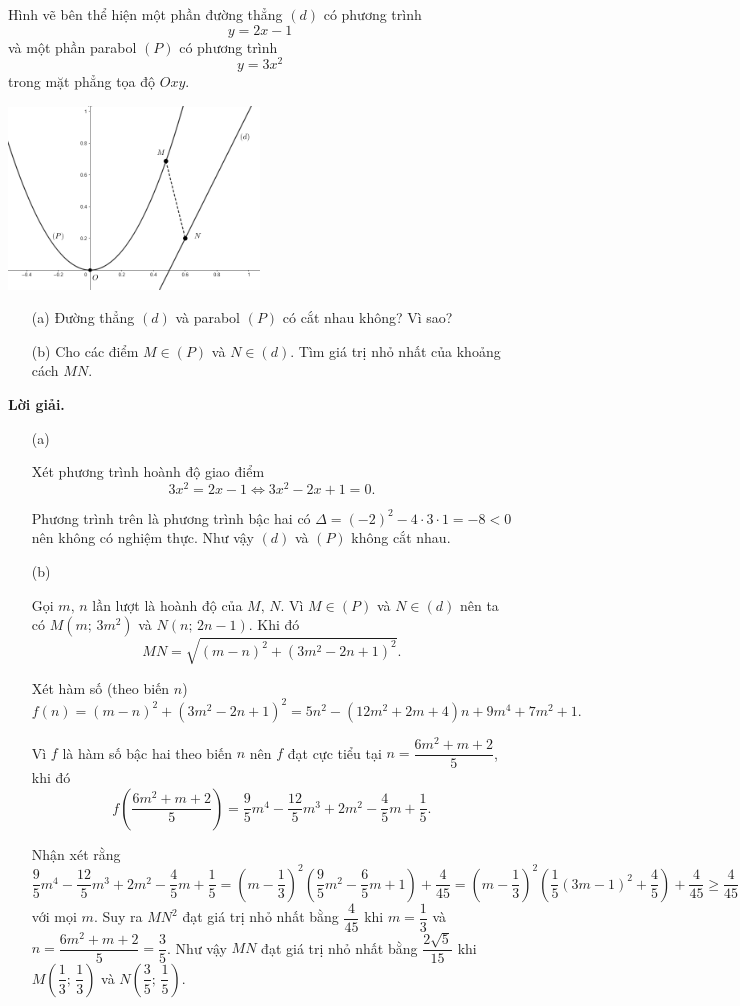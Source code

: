 \begin{tcolorbox}[title=\textbf{Bài toán B.3 + A.3.},breakable]
    Hình vẽ bên thể hiện một phần đường thẳng $(d)$ có phương trình $$y = 2x - 1$$ và một phần parabol $(P)$ có phương trình $$y = 3x^2$$ trong mặt phẳng tọa độ $Oxy$.
    \begin{center}
        \includegraphics[width=0.5\textwidth]{Figures/04.png}
    \end{center}
    \begin{enumerate}
        \item[(a)] {Đường thẳng $(d)$ và parabol $(P)$ có cắt nhau không? Vì sao?}
        \item[(b)] {Cho các điểm $M \in (P)$ và $N\in (d)$. Tìm giá trị nhỏ nhất của khoảng cách $MN$.} 
    \end{enumerate}
\end{tcolorbox}

\textbf{Lời giải. }

\begin{enumerate}
    \item[(a)] {Xét phương trình hoành độ giao điểm $$3x^2 = 2x - 1 \iff 3x^2 - 2x + 1 = 0.$$
    
    Phương trình trên là phương trình bậc hai có $\Delta = (-2)^2 - 4\cdot 3 \cdot 1 = -8 < 0$ nên không có nghiệm thực. Như vậy $(d)$ và $(P)$ không cắt nhau.}
    \item[(b)] {Gọi $m,\,n$ lần lượt là hoành độ của $M,\,N$. Vì $M\in (P)$ và $N \in (d)$ nên ta có $M\left(m;\,3m^2\right)$ và $N\left(n;\,2n-1\right)$. Khi đó $$MN = \sqrt{(m-n)^2 + (3m^2 - 2n + 1)^2}.$$
    
    Xét hàm số (theo biến $n$) $$f(n) = (m-n)^2 + (3m^2 - 2n + 1)^2 = 5n^2 - (12m^2+2m+4)n + 9m^4 + 7m^2 + 1.$$
    
    Vì $f$ là hàm số bậc hai theo biến $n$ nên $f$ đạt cực tiểu tại $n = \dfrac{6m^2+m+2}{5}$, khi đó $$f\left(\dfrac{6m^2+m+2}{5}\right) = \dfrac{9}{5}m^4 - \dfrac{12}{5}m^3 + 2m^2 - \dfrac{4}{5}m + \dfrac{1}{5}.$$
    
    Nhận xét rằng $\dfrac{9}{5}m^4 - \dfrac{12}{5}m^3 + 2m^2 - \dfrac{4}{5}m + \dfrac{1}{5} = \left(m - \dfrac{1}{3}\right)^2\left(\dfrac{9}{5}m^2 - \dfrac{6}{5}m + 1\right) + \dfrac{4}{45} = \left(m - \dfrac{1}{3}\right)^2\left(\dfrac{1}{5}(3m - 1)^2 + \dfrac{4}{5}\right) + \dfrac{4}{45} \geq \dfrac{4}{45}$ với mọi $m$. Suy ra $MN^2$ đạt giá trị nhỏ nhất bằng $\dfrac{4}{45}$ khi $m = \dfrac{1}{3}$ và $n = \dfrac{6m^2+m+2}{5} = \dfrac{3}{5}$. Như vậy $MN$ đạt giá trị nhỏ nhất bằng $\dfrac{2\sqrt{5}}{15}$ khi $M\left(\dfrac{1}{3};\,\dfrac{1}{3}\right)$ và $N\left(\dfrac{3}{5};\,\dfrac{1}{5}\right)$.}
\end{enumerate}

